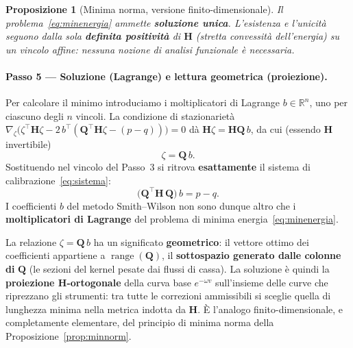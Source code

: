 \documentclass[11pt,a4paper]{article}
\theoremstyle{plain}
\newtheorem{proposizione}[teorema]{Proposizione}
\theoremstyle{definition}
\theoremstyle{remark}
\newcommand{\Qmat}{\mathbf{Q}}
\newcommand{\Hmat}{\mathbf{H}}
\newcommand{\transp}{^{\!\top}}
\begin{document}
\begin{proposizione}[Minima norma, versione finito-dimensionale]
\label{prop:minnorm-finita}
Il problema~\eqref{eq:minenergia} ammette \textbf{soluzione unica}. L'esistenza e
l'unicit\`a seguono dalla sola \textbf{definita positivit\`a} di $\Hmat$ (stretta
convessit\`a dell'energia) su un vincolo affine: nessuna nozione di analisi funzionale \`e
necessaria.
\end{proposizione}

\paragraph{Passo 5 --- Soluzione (Lagrange) e lettura geometrica (proiezione).}
Per calcolare il minimo introduciamo i moltiplicatori di Lagrange $b\in\mathbb{R}^n$, uno
per ciascuno degli $n$ vincoli. La condizione di stazionariet\`a
$\nabla_\zeta\bigl(\zeta\transp\Hmat\zeta - 2\,b\transp(\Qmat\transp\Hmat\zeta - (p-q))\bigr)=0$
d\`a $\Hmat\zeta = \Hmat\Qmat\,b$, da cui (essendo $\Hmat$ invertibile)
\[
  \zeta = \Qmat\, b .
\]
Sostituendo nel vincolo del Passo~3 si ritrova \textbf{esattamente} il sistema di
calibrazione~\eqref{eq:sistema}:
\[
  \bigl(\Qmat\transp \Hmat\, \Qmat\bigr)\, b = p - q .
\]
I coefficienti $b$ del metodo Smith--Wilson non sono dunque altro che i
\textbf{moltiplicatori di Lagrange} del problema di minima energia~\eqref{eq:minenergia}.

La relazione $\zeta = \Qmat\,b$ ha un significato \textbf{geometrico}: il vettore ottimo dei
coefficienti appartiene a $\operatorname{range}(\Qmat)$, il \textbf{sottospazio generato
dalle colonne di} $\Qmat$ (le sezioni del kernel pesate dai flussi di cassa). La soluzione
\`e quindi la \textbf{proiezione $\Hmat$-ortogonale} della curva base $e^{-\omega v}$
sull'insieme delle curve che riprezzano gli strumenti: tra tutte le correzioni ammissibili
si sceglie quella di lunghezza minima nella metrica indotta da $\Hmat$. \`E l'analogo
finito-dimensionale, e completamente elementare, del principio di minima norma della
Proposizione~\ref{prop:minnorm}.
\end{document}
